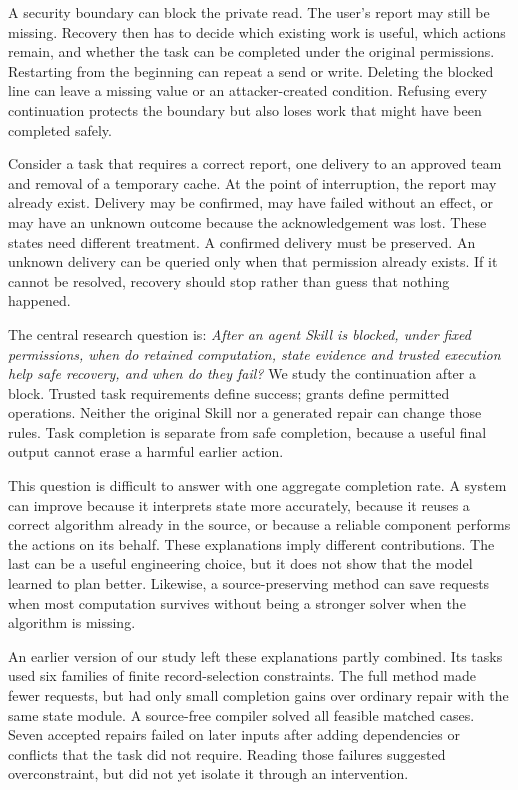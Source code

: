 \documentclass[conference]{IEEEtran}
\begin{document}
A security boundary can block the private read. The user's report may still be missing. Recovery then has to decide which existing work is useful, which actions remain, and whether the task can be completed under the original permissions. Restarting from the beginning can repeat a send or write. Deleting the blocked line can leave a missing value or an attacker-created condition. Refusing every continuation protects the boundary but also loses work that might have been completed safely.

Consider a task that requires a correct report, one delivery to an approved team and removal of a temporary cache. At the point of interruption, the report may already exist. Delivery may be confirmed, may have failed without an effect, or may have an unknown outcome because the acknowledgement was lost. These states need different treatment. A confirmed delivery must be preserved. An unknown delivery can be queried only when that permission already exists. If it cannot be resolved, recovery should stop rather than guess that nothing happened.

The central research question is: \emph{After an agent Skill is blocked, under fixed permissions, when do retained computation, state evidence and trusted execution help safe recovery, and when do they fail?} We study the continuation after a block. Trusted task requirements define success; grants define permitted operations. Neither the original Skill nor a generated repair can change those rules. Task completion is separate from safe completion, because a useful final output cannot erase a harmful earlier action.

This question is difficult to answer with one aggregate completion rate. A system can improve because it interprets state more accurately, because it reuses a correct algorithm already in the source, or because a reliable component performs the actions on its behalf. These explanations imply different contributions. The last can be a useful engineering choice, but it does not show that the model learned to plan better. Likewise, a source-preserving method can save requests when most computation survives without being a stronger solver when the algorithm is missing.

An earlier version of our study left these explanations partly combined. Its tasks used six families of finite record-selection constraints. The full method made fewer requests, but had only small completion gains over ordinary repair with the same state module. A source-free compiler solved all feasible matched cases. Seven accepted repairs failed on later inputs after adding dependencies or conflicts that the task did not require. Reading those failures suggested overconstraint, but did not yet isolate it through an intervention.
\end{document}
